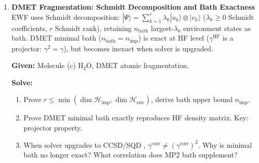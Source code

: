 \documentclass[fontset=mac]{ctexart}
\newcommand{\ket}[1]{|#1\rangle}
\begin{document}
\begin{enumerate}
    \textbf{Solution:}
    \begin{enumerate}[label=(\alph*)]
        \item 直接计算即可，H$_2$是$\binom{4}{2}=6$，LiH是$\binom{8}{4}=70$，H$_2$O是$\binom{14}{10}=1001$，N$_2$是$\binom{20}{14}=38760$，C$_2$H$_4$是$\binom{28}{16}=30421755$。
        \item 当 $n_{\text{frag}}$ 固定时，每个片段的 FCI 维数 $\binom{2n_{\text{frag}}}{N_{\text{frag}}}$ 有上界，其对角化代价为 $O(D_{\text{frag}}^3)=O(1)$，片段总数为 $F = N/n_{\text{frag}}$，所以 EWF 总代价为 $O(N)$。
        \item C$_2$H$_4$ 最大碎片为 20 量子比特，该碎片的 FCI 维数最大是 $\binom{20}{10}=184756$，全分子的 FCI 维数最大是 $30421755$，二者之比
        \[
            \frac{184756}{30421755}\approx 0.6\%.
        \]
        \item 假设电子均匀地分布在每个碎片中，得到方程
        \[
            \binom{2n_{\text{frag}}}{N_e n_{\text{frag}}/N}
            =
            \binom{2N}{N_e}
            \left(\frac{n_{\text{frag}}}{N}\right)^{1/3}.
        \]
        我们来证明：对于 $n_{\text{frag}}<N$，左边总是比右边小很多倍，进而 EWF 总是比直接的 FCI 需要更少的时间复杂度（显然当 $n_{\text{frag}}=N$ 时是相等的）。

        设 $\frac{N}{n_{\text{frag}}}=t$，把左边的组合数记为 $\binom{a}{b}$，有如下推导：
        \[
            \binom{2N}{N_e}=\binom{ta}{tb}=\prod_{i=1}^{tb}\frac{ta-i+1}{tb-i+1}=\prod_{\substack{i=1\\t\nmid i-1}}^{n}\frac{ta-i+1}{tb-i+1}\cdot\binom{a}{b}\geq(ta-tb+1)\binom{a}{b}>\sqrt[3]{t}\binom{a}{b}.
        \]
        证明完毕。
    \end{enumerate}

    \item \textbf{DMET Fragmentation: Schmidt Decomposition and Bath Exactness} \\ EWF uses Schmidt decomposition: $\ket{\Psi} = \sum_{k=1}^{r}\lambda_k\ket{u_k}\otimes\ket{v_k}$ ($\lambda_k\geq 0$ Schmidt coefficients, $r$ Schmidt rank), retaining $n_{\text{bath}}$ largest-$\lambda_k$ environment states as bath. DMET minimal bath ($n_{\text{bath}}{=}n_{\text{imp}}$) is exact at HF level ($\gamma^{\text{HF}}$ is a projector: $\gamma^2{=}\gamma$), but becomes inexact when solver is upgraded.

    \textbf{Given:} Molecule (c) H$_2$O, DMET atomic fragmentation.

    \textbf{Solve:}
    \begin{enumerate}[label=(\alph*)]
        \item Prove $r \leq \min(\dim\mathcal{H}_{\text{imp}}, \dim\mathcal{H}_{\text{env}})$, derive bath upper bound $n_{\text{imp}}$.
        \item Prove DMET minimal bath exactly reproduces HF density matrix. Key: projector property.
        \item When solver upgrades to CCSD/SQD , $\gamma^{\text{corr}} \neq (\gamma^{\text{corr}})^2$. Why is minimal bath no longer exact? What correlation does MP2 bath supplement?
    \end{enumerate}


\end{enumerate}
\end{document}
